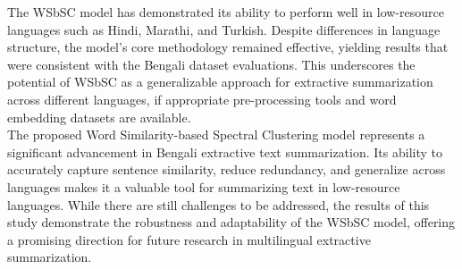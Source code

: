 The WSbSC model has demonstrated its ability to perform well in low-resource languages
such as Hindi, Marathi, and Turkish.
Despite differences in language structure, the model’s core methodology remained effective,
yielding results that were consistent with the Bengali dataset evaluations.
This underscores the potential of WSbSC as a generalizable approach
for extractive summarization across different languages, if
appropriate pre-processing tools and word embedding datasets are available.\\

The proposed Word Similarity-based Spectral Clustering model represents a
significant advancement in Bengali extractive text summarization.
Its ability to accurately capture sentence similarity, reduce redundancy, and generalize
across languages makes it a valuable tool for summarizing text in low-resource languages.
While there are still challenges to be addressed, the results of this study demonstrate the
robustness and adaptability of the WSbSC model, offering a promising direction for future research
in multilingual extractive summarization.
